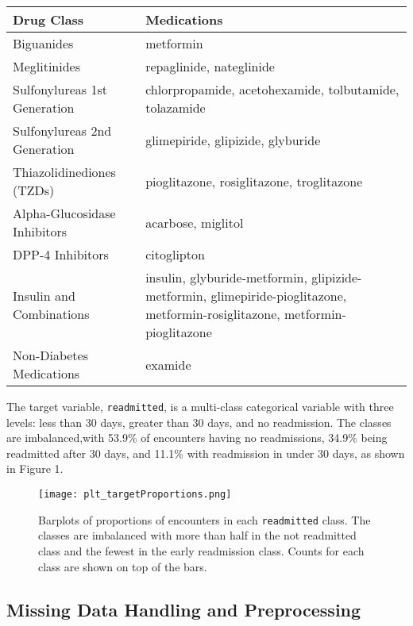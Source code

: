 \documentclass{article}      %
\begin{document}
\begin{table}[h!]
    \centering
    \begin{tabular}{|l|p{9cm}|}
    \hline
    \textbf{Drug Class} & \textbf{Medications} \\ \hline \hline
    Biguanides & metformin \\ \hline
    Meglitinides & repaglinide, nateglinide \\ \hline
    Sulfonylureas 1st Generation & chlorpropamide, acetohexamide, tolbutamide, tolazamide \\ \hline
    Sulfonylureas 2nd Generation & glimepiride, glipizide, glyburide \\ \hline
    Thiazolidinediones (TZDs) & pioglitazone, rosiglitazone, troglitazone \\ \hline
    Alpha-Glucosidase Inhibitors & acarbose, miglitol \\ \hline
    DPP-4 Inhibitors & citoglipton \\ \hline
    Insulin and Combinations & insulin, glyburide-metformin, glipizide-metformin, glimepiride-pioglitazone, metformin-rosiglitazone, metformin-pioglitazone \\ \hline
    Non-Diabetes Medications & examide \\ \hline
    \end{tabular}
    \label{table:drug_classes}
\end{table}

The target variable, \texttt{readmitted}, is a multi-class categorical variable with three levels: less than 30 days, greater than 30 days, and no readmission. The classes are imbalanced,with 53.9\% of encounters having no readmissions, 34.9\% being readmitted after 30 days, and 11.1\% with readmission in under 30 days, as shown in Figure 1.

\begin{figure}[h]
	\centering
	\texttt{[image: plt\_targetProportions.png]}
	\caption{Barplots of proportions of encounters in each \texttt{readmitted} class. The classes are imbalanced with more than half in the not readmitted class and the fewest in the early readmission class. Counts for each class are shown on top of the bars.}
	\label{fig:target_barplot}
\end{figure}

\subsection{Missing Data Handling and Preprocessing}
\end{document}

